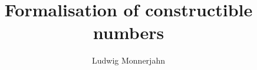 \documentclass[12pt]{article}
\title{Formalisation of constructible numbers}
\author{Ludwig Monnerjahn}
\theoremstyle{definition}
\theoremstyle{remark}
\begin{document}
\maketitle









\nocite{*}
\end{document}

